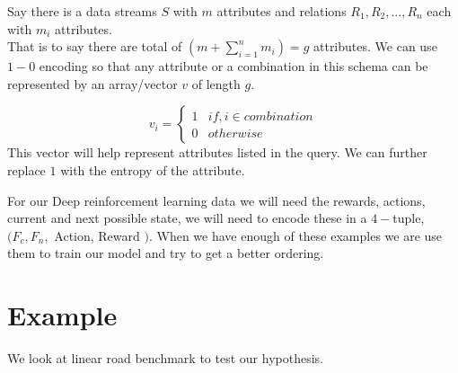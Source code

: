 
\par Say there is a data streams $S$ with $m$ attributes and relations $R_1,R_2,...,R_{n}$ each with $m_{i}$ attributes.
\\ That is to say there are total of $(m + \sum_{i=1}^{n}m_i)=g$ attributes. We can use $1-0$ encoding so that any attribute or a combination in this schema can be represented by an array/vector $v$ of length $g$. 

\[ 
   v_i=
   \begin{cases} 
      1 & if, i \in combination \\
      0 & otherwise 
   \end{cases}
\] 
This vector will help represent attributes listed in the query. We can further replace $1$ with the entropy of the attribute.
\par For our Deep reinforcement learning data we will need the rewards, actions, current and next possible state, we will need to encode these in a $4-$tuple, $(F_c,F_n,$ Action, Reward $)$. When we have enough of these examples we are use them to train our model and try to get a better ordering.

\section{Example}
We look at linear road benchmark to test our hypothesis.\
